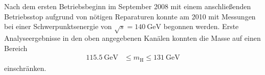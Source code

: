 Nach dem ersten Betriebsbeginn im September 2008 mit einem anschließenden Betriebsstop aufgrund von nötigen Reparaturen konnte am 2010 mit Messungen bei einer Schwerpunktsenergie von $\sqrt{s} = \SI{140}{\giga\electronvolt}$ begonnen werden.
Erste Analyseergebnisse in den oben angegebenen Kanälen konnten die Masse auf einen Bereich 
\begin{align*}
	\SI{115.5}{\giga\electronvolt} &\leq m_\text{H} \leq \SI{131}{\giga\electronvolt}
\end{align*}
einschränken.

